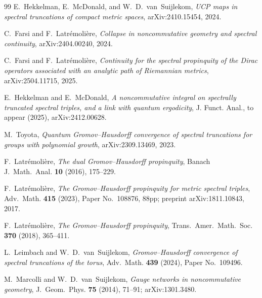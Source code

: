 \documentclass[11pt,a4paper]{article}
\theoremstyle{plain}
\theoremstyle{definition}
\begin{document}
\begin{thebibliography}{99}
E.~Hekkelman, E.~McDonald, and W.~D.~van~Suijlekom,
\newblock \emph{UCP maps in spectral truncations of compact metric
spaces},
\newblock arXiv:2410.15454, 2024.

C.~Farsi and F.~Latr\'emoli\`ere,
\newblock \emph{Collapse in noncommutative geometry and spectral
continuity},
\newblock arXiv:2404.00240, 2024.

C.~Farsi and F.~Latr\'emoli\`ere,
\newblock \emph{Continuity for the spectral propinquity of the
Dirac operators associated with an analytic path of Riemannian
metrics},
\newblock arXiv:2504.11715, 2025.

E.~Hekkelman and E.~McDonald,
\newblock \emph{A noncommutative integral on spectrally truncated
spectral triples, and a link with quantum ergodicity},
\newblock J. Funct. Anal., to appear (2025), arXiv:2412.00628.

M.~Toyota,
\newblock \emph{Quantum Gromov--Hausdorff convergence of spectral
truncations for groups with polynomial growth},
\newblock arXiv:2309.13469, 2023.

F.~Latr\'emoli\`ere,
\newblock \emph{The dual Gromov--Hausdorff propinquity},
\newblock Banach J.~Math.~Anal. \textbf{10} (2016), 175--229.

F.~Latr\'emoli\`ere,
\newblock \emph{The Gromov--Hausdorff propinquity for metric spectral
triples},
\newblock Adv.~Math. \textbf{415} (2023), Paper No.~108876, 88pp;
\newblock preprint arXiv:1811.10843, 2017.

F.~Latr\'emoli\`ere,
\newblock \emph{The Gromov--Hausdorff propinquity},
\newblock Trans.~Amer.~Math.~Soc. \textbf{370} (2018), 365--411.

L.~Leimbach and W.~D.~van~Suijlekom,
\newblock \emph{Gromov--Hausdorff convergence of spectral truncations
of the torus},
\newblock Adv.~Math. \textbf{439} (2024), Paper No.~109496.

M.~Marcolli and W.~D.~van~Suijlekom,
\newblock \emph{Gauge networks in noncommutative geometry},
\newblock J.~Geom.~Phys. \textbf{75} (2014), 71--91;
\newblock arXiv:1301.3480.


\end{thebibliography}
\end{document}

